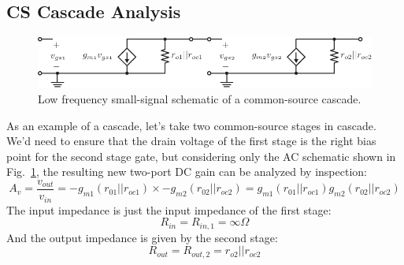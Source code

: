 \subsection{CS Cascade Analysis}
\begin{figure}[tb]
\centering
\includegraphics[scale=1]{2cs_casc_ss}
\caption{Low frequency small-signal schematic of a common-source cascade.}
\label{fig:2cs_casc_ss}
\end{figure}
As an example of a cascade, let's take two common-source stages in cascade.  We'd need to ensure that the drain voltage of the first stage is the right bias point for the second stage gate, but considering only the AC schematic shown in Fig.~\ref{fig:2cs_casc_ss}, the resulting new two-port DC gain can be analyzed by inspection:
    \begin{equation}
        A_v = \frac{v_{out}}{v_{in}} = -g_{m1} (r_{01}||r_{oc1}) \times  -g_{m2} (r_{02}||r_{oc2}) = g_{m1} (r_{01}||r_{oc1}) g_{m2} (r_{02}||r_{oc2})
    \end{equation}
The input impedance is just the input impedance of the first stage:
    \begin{equation}
        R_{in} = R_{in,1} = \infty\Omega 
    \end{equation} 
And the output impedance is given by the second stage:
    \begin{equation}
        R_{out} = R_{out,2} = r_{o2} || r_{oc2} 
    \end{equation}
